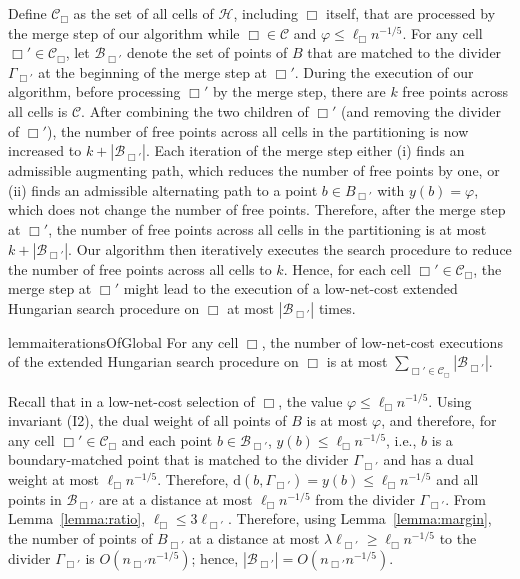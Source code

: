 \documentclass[11pt,onecolumn]{article}
\def\mcB{{\mathcal{B}}}
\def\mcC{{\mathcal{C}}}
\def\mcH{{\mathcal{H}}}
\newcommand{\cell}{\Box}
\newcommand{\distance}[2]{\mathrm{d}(#1, #2)}
\newcommand{\divider}[1]{\Gamma_{#1}}
\newcommand{\ymax}{\varphi}
\begin{document}
Define $\mcC_\cell$ as the set of all cells of $\mcH$, including $\cell$ itself, that are processed by the merge step of our algorithm while $\cell\in\mcC$ and $\ymax\le \ell_\cell n^{-1/5}$. For any cell $\cell'\in\mcC_\cell$, let $\mcB_{\cell'}$ denote the set of points of $B$ that are matched to the divider $\Gamma_{\cell'}$ at the beginning of the merge step at $\cell'$. During the execution of our algorithm, before processing $\cell'$ by the merge step, there are $k$ free points across all cells is $\mcC$. After combining the two children of $\cell'$ (and removing the divider of $\cell'$), the number of free points across all cells in the partitioning is now increased to $k + |\mcB_{\cell'}|$. Each iteration of the merge step either (i) finds an admissible augmenting path, which reduces the number of free points by one, or (ii) finds an admissible alternating path to a point $b\in B_{\cell'}$ with $y(b)=\ymax$, which does not change the number of free points. Therefore, after the merge step at $\cell'$, the number of free points across all cells in the partitioning is at most $k + |\mcB_{\cell'}|$. Our algorithm then iteratively executes the search procedure to reduce the number of free points across all cells to $k$. Hence, for each cell $\cell'\in\mcC_\cell$, the merge step at $\cell'$ might lead to the execution of a low-net-cost extended Hungarian search procedure on $\cell$ at most $|\mcB_{\cell'}|$ times.

\begin{restatable}{lemma}{iterationsOfGlobal}\label{lemma:global-iterations}
    For any cell $\cell$, the number of low-net-cost executions of the extended Hungarian search procedure on $\cell$ is at most $\sum_{\cell'\in\mcC_\cell} |\mcB_{\cell'}|$.
\end{restatable}

Recall that in a low-net-cost selection of $\cell$, the value $\ymax\le \ell_\cell n^{-1/5}$. Using invariant (I2), the dual weight of all points of $B$ is at most $\ymax$, and therefore, for any cell $\cell'\in\mcC_{\cell}$ and each point $b\in \mcB_{\cell'}$, $y(b)\le \ell_\cell n^{-1/5}$, i.e., $b$ is a boundary-matched point that is matched to the divider $\divider{\cell'}$ and has a dual weight at most $\ell_\cell n^{-1/5}$. Therefore, $\distance{b}{\divider{\cell'}} = y(b) \le \ell_\cell n^{-1/5}$ and all points in $\mcB_{\cell'}$ are at a distance at most $\ell_\cell n^{-1/5}$ from the divider $\divider{\cell'}$. From Lemma~\ref{lemma:ratio}, $\ell_{\cell}\le 3\ell_{\cell'}$. Therefore, using Lemma~\ref{lemma:margin}, the number of points of $B_{\cell'}$ at a distance at most $\lambda\ell_{\cell'}\ge \ell_\cell n^{-1/5}$ to the divider $\divider{\cell'}$ is $O(n_{\cell'}n^{-1/5})$; hence, $|\mcB_{\cell'}| = O(n_{\cell'}n^{-1/5})$.
\end{document}
